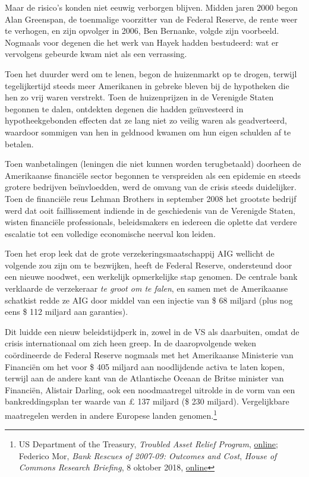 \documentclass[
  a5paper,
  smalldemyvopaper,11pt,twoside,onecolumn,openright,extrafontsizes,
hidelinks]{memoir}
\begin{document}
Maar de risico's konden niet eeuwig verborgen blijven. Midden jaren 2000
begon Alan Greenspan, de toenmalige voorzitter van de Federal Reserve,
de rente weer te verhogen, en zijn opvolger in 2006, Ben Bernanke,
volgde zijn voorbeeld. Nogmaals voor degenen die het werk van Hayek
hadden bestudeerd: wat er vervolgens gebeurde kwam niet als een
verrassing.

Toen het duurder werd om te lenen, begon de huizenmarkt op te drogen,
terwijl tegelijkertijd steeds meer Amerikanen in gebreke bleven bij de
hypotheken die hen zo vrij waren verstrekt. Toen de huizenprijzen in de
Verenigde Staten begonnen te dalen, ontdekten degenen die hadden
geïnvesteerd in hypotheekgebonden effecten dat ze lang niet zo veilig
waren als geadverteerd, waardoor sommigen van hen in geldnood kwamen om
hun eigen schulden af te betalen.

Toen wanbetalingen (leningen die niet kunnen worden terugbetaald)
doorheen de Amerikaanse financiële sector begonnen te verspreiden als
een epidemie en steeds grotere bedrijven beïnvloedden, werd de omvang
van de crisis steeds duidelijker. Toen de financiële reus Lehman
Brothers in september 2008 het grootste bedrijf werd dat ooit
faillissement indiende in de geschiedenis van de Verenigde Staten,
wisten financiële professionals, beleidsmakers en iedereen die oplette
dat verdere escalatie tot een volledige economische neerval kon leiden.

Toen het erop leek dat de grote verzekeringsmaatschappij AIG wellicht de
volgende zou zijn om te bezwijken, heeft de Federal Reserve, ondersteund
door een nieuwe noodwet, een werkelijk opmerkelijke stap genomen. De
centrale bank verklaarde de verzekeraar \emph{te groot om te falen}, en
samen met de Amerikaanse schatkist redde ze AIG door middel van een
injectie van \$ 68 miljard (plus nog eens \$ 112 miljard aan garanties).

Dit luidde een nieuw beleidstijdperk in, zowel in de VS als daarbuiten,
omdat de crisis internationaal om zich heen greep. In de daaropvolgende
weken coördineerde de Federal Reserve nogmaals met het Amerikaanse
Ministerie van Financiën om het voor \$ 405 miljard aan noodlijdende
activa te laten kopen, terwijl aan de andere kant van de Atlantische
Oceaan de Britse minister van Financiën, Alistair Darling, ook een
noodmaatregel uitrolde in de vorm van een bankreddingsplan ter waarde
van £ 137 miljard (\$ 230 miljard). Vergelijkbare maatregelen werden in
andere Europese landen genomen.\footnote{US Department of the Treasury,
  \emph{Troubled Asset Relief Program},
  \href{https://home.treasury.gov/data/troubled-asset-relief-program}{online};
  Federico Mor, \emph{Bank Rescues of 2007-09: Outcomes and Cost},
  \emph{House of Commons Research Briefing}, 8 oktober 2018,
  \href{https://commonslibrary.parliament.uk/research-briefings/sn05748/}{online}}
\end{document}

